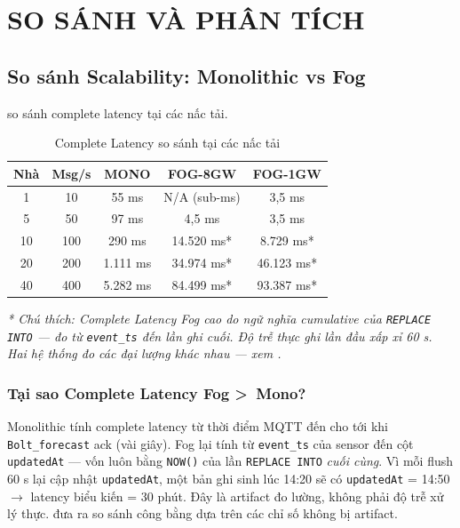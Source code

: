\documentclass[13pt,a4paper]{report}
\newcommand{\code}[1]{\texttt{\small #1}}
\begin{document}
\chapter{SO SÁNH VÀ PHÂN TÍCH}
\label{ch:sosanh}

\section{So sánh Scalability: Monolithic vs Fog}

 so sánh complete latency tại các nấc tải.

\begin{table}[H]
\centering
\caption{Complete Latency so sánh tại các nấc tải}
\label{tab:cl-compare}
\small
\begin{tabular}{c c c c c}
\toprule
\textbf{Nhà} & \textbf{Msg/s} & \textbf{MONO} & \textbf{FOG-8GW} & \textbf{FOG-1GW} \\
\midrule
1  & 10  & 55 ms     & N/A (sub-ms)  & 3,5 ms \\
5  & 50  & 97 ms     & 4,5 ms        & 3,5 ms \\
10 & 100 & 290 ms    & 14.520 ms*    & 8.729 ms* \\
20 & 200 & 1.111 ms  & 34.974 ms*    & 46.123 ms* \\
40 & 400 & 5.282 ms  & 84.499 ms*    & 93.387 ms* \\
\bottomrule
\end{tabular}
\end{table}

\noindent\textit{* Chú thích: Complete Latency Fog cao do ngữ nghĩa cumulative
của \code{REPLACE INTO} --- đo từ \code{event\_ts} đến lần ghi cuối. Độ trễ thực
ghi lần đầu xấp xỉ 60 s. Hai hệ thống đo các đại lượng khác nhau --- xem
.}

\subsection{Tại sao Complete Latency Fog \textgreater\ Mono?}
\label{sec:why-latency}

Monolithic tính complete latency từ thời điểm MQTT đến cho tới khi
\code{Bolt\_forecast} ack (vài giây). Fog lại tính từ \code{event\_ts} của sensor
đến cột \code{updatedAt} --- vốn luôn bằng \code{NOW()} của lần \code{REPLACE INTO}
\textit{cuối cùng}. Vì mỗi flush 60 s lại cập nhật \code{updatedAt}, một bản ghi
sinh lúc 14:20 sẽ có \code{updatedAt} = 14:50 $\to$ latency biểu kiến = 30 phút.
Đây là artifact đo lường, không phải độ trễ xử lý thực. 
đưa ra so sánh công bằng dựa trên các chỉ số không bị artifact.
\end{document}
